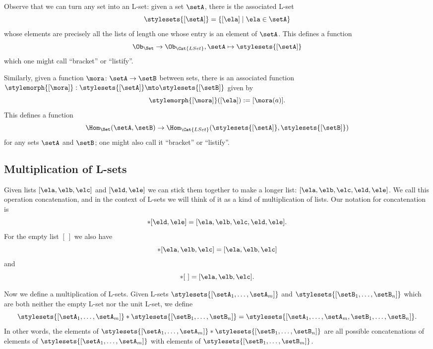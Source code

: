 Observe that we can turn any set into an L-set: given a set $\setA$, there is the associated L-set
\begin{equation}
    \stylesets{[\setA]} = \{ [\ela] \mid \ela \in \setA \}
\end{equation}
whose elements are precisely all the lists of length one whose entry is an element of $\setA$.
This defines a function
\begin{equation}
    \Ob_{\Set} \to \Ob_{\Cat{LSet}}, \setA \mapsto \stylesets{[\setA]}
\end{equation}
which one might call ``bracket'' or ``listify''.

Similarly, given a function $\mora \colon \setA \to \setB$ between sets, there is an associated function $\stylemorph{[ \mora ]}: \stylesets{[\setA]} \mto \stylesets{[\setB]}$ given by
\begin{equation}
    \stylemorph{[ \mora ]} ([ \ela ]) := [\mora(a)].
\end{equation}
This defines a function
\begin{equation}
    \Hom_{\Set}(\setA,\setB) \to \Hom_{\Cat{LSet}}(\stylesets{[\setA]},\stylesets{[\setB]})
\end{equation}
for any sets $\setA$ and $\setB$; one might also call it ``bracket'' or ``listify''.

\subsection{Multiplication of L-sets}

Given lists $[\ela, \elb, \elc]$ and $[\eld, \ele]$ we can stick them together to make a longer list: $[\ela, \elb, \elc, \eld, \ele]$.
We call this operation concatenation, and in the context of L-sets we will think of it as a kind of multiplication of lists.
Our notation for concatenation is
\begin{equation}
    [\ela, \elb, \elc] * [\eld, \ele] = [\ela, \elb, \elc, \eld, \ele].
\end{equation}
For the empty list $[ \ ]$ we also have
\begin{equation}
    [ \ ] * [\ela, \elb, \elc]  = [\ela, \elb, \elc]
\end{equation}
and
\begin{equation}
    [\ela, \elb, \elc]  * [ \ ] = [\ela, \elb, \elc].
\end{equation}

Now we define a multiplication of L-sets.
Given L-sets $\stylesets{[\setA_1, \dots, \setA_m]}$ and $\stylesets{[\setB_1,  \dots, \setB_n]}$ which are both neither the empty L-set nor the unit L-set, we define
\begin{equation}
    \stylesets{[\setA_1, \dots, \setA_m]} * \stylesets{[\setB_1, \dots, \setB_n]} = \stylesets{[\setA_1, \dots, \setA_m, \setB_1,  \dots, \setB_n]}.
\end{equation}
In other words, the elements of $\stylesets{[\setA_1, \dots, \setA_m]} * \stylesets{[\setB_1, \dots, \setB_n]}$ are all possible concatenations of elements of $\stylesets{[\setA_1, \dots, \setA_m]}$ with elements of $\stylesets{[\setB_1, \dots, \setB_m]}$.

